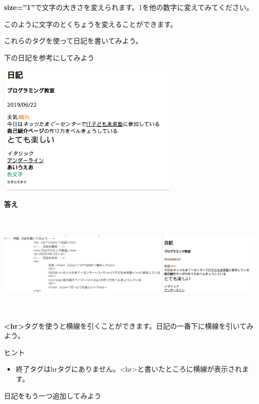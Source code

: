 \documentclass[a4paper,12pt]{jarticle}
\begin{document}
\textbf{size=”1”}で文字の大きさを変えられます。1を他の数字に変えてみてください。

このように文字のとくちょうを変えることができます。


\bigskip

これらのタグを使って日記を書いてみよう。

下の日記を参考にしてみよう


\bigskip

\includegraphics[width=8.779cm,height=6.412cm]{textbook-img185.png}

\clearpage
\textbf{答え}



\includegraphics[width=16.163cm,height=5.057cm]{textbook-img188.png}

\theQuestion\label{Q:hasAnswer04-8}
\textbf{{\textless}hr{\textgreater}}タグを使うと横線を引くことができます。日記の一番下に横線を引いてみよう。

ヒント

\begin{itemize}
  \item
        終了タグはhrタグにありません。{\textless}hr{\textgreater}と書いたところに横線が表示されます。
\end{itemize}
\theQuestion\label{Q:hasAnswer04-9}

日記をもう一つ追加してみよう
\end{document}
